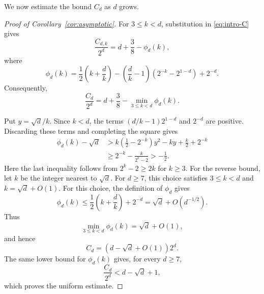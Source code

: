 \documentclass[reqno,a4paper,11pt]{amsart}
\numberwithin{equation}{section}
\theoremstyle{plain}
\theoremstyle{definition}
\begin{document}
We now estimate the bound \(C_d\) as \(d\) grows.
\medskip

\begin{proof}[Proof of Corollary~\ref{cor:asymptotic}]
For \(3\leq k<d\), substitution in \eqref{eq:intro-C} gives
\[
 \frac{C_{d,k}}{2^d}=d+\frac38-\phi_d(k),
\]
where
\[
 \phi_d(k)=\frac12\left(k+\frac dk\right)
 -\left(\frac dk-1\right)(2^{-k}-2^{1-d})
 +2^{-d}.
\]
Consequently,
\[
 \frac{C_d}{2^d}
 =d+\frac38-\min_{3\leq k<d}\phi_d(k).
\]

Put \(y=\sqrt d/k\).
Since \(k<d\), the terms \((d/k-1)2^{1-d}\) and \(2^{-d}\) are positive.
Discarding these terms and completing the square gives
\[
 \begin{aligned}
 \phi_d(k)-\sqrt d
 &>k\left(\frac12-2^{-k}\right)y^2-ky
   +\frac k2+2^{-k}\\
 &\geq2^{-k}-\frac{k}{2^k-2}>-\frac12.
 \end{aligned}
\]
Here the last inequality follows from \(2^k-2\geq2k\) for \(k\geq3\).
For the reverse bound, let \(k\) be the integer nearest to \(\sqrt d\).
For \(d\geq7\), this choice satisfies \(3\leq k<d\) and \(k=\sqrt d+O(1)\).
For this choice, the definition of \(\phi_d\) gives
\[
 \phi_d(k)\leq\frac12\left(k+\frac dk\right)+2^{-d}
 =\sqrt d+O(d^{-1/2}).
\]
Thus
\[
 \min_{3\leq k<d}\phi_d(k)
 =\sqrt d+O(1),
\]
and hence
\[
 C_d=
 \left(d-\sqrt d+O(1)\right)2^d.
\]
The same lower bound for \(\phi_d(k)\) gives, for every \(d\geq7\),
\[
 \frac{C_d}{2^d}
 <d-\sqrt d+1,
\]
which proves the uniform estimate.
\end{proof}



\end{document}
